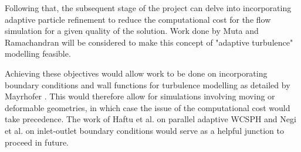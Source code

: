 Following that, the subsequent stage of the project can delve into incorporating adaptive particle refinement to reduce the computational cost for the flow simulation for a given quality of the solution. Work done by Muta and Ramachandran \parencite{Muta2022} will be considered to make this concept of "adaptive turbulence" modelling feasible.

Achieving these objectives would allow work to be done on incorporating boundary conditions and wall functions for turbulence modelling as detailed by Mayrhofer \parencite{Mayrhofer2014}. 
This would therefore allow for simulations involving moving or deformable geometries, in which case the issue of the computational cost would take precedence. The work of Haftu et al. \parencite{Haftu2022} on parallel adaptive WCSPH and Negi et al. \parencite{negi2020improved} on inlet-outlet boundary conditions would serve as a helpful junction to proceed in future.
